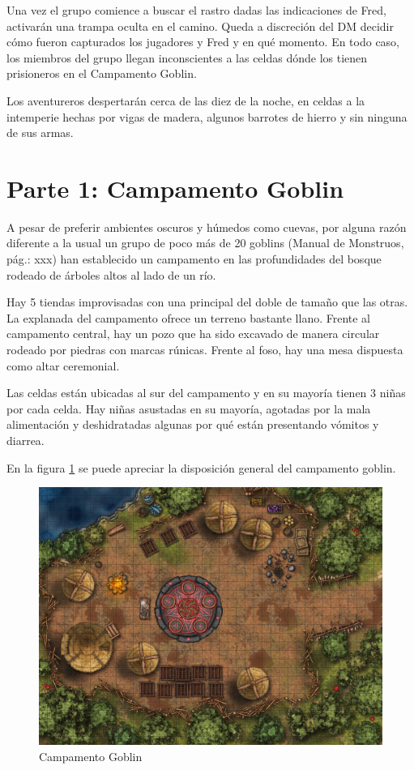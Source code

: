 \documentclass[10pt,twoside,twocolumn,openany]{dndbook}
\begin{document}
Una vez el grupo comience a buscar el rastro dadas las indicaciones de Fred, activarán una trampa
oculta en el camino. Queda a discreción del DM decidir cómo fueron capturados los jugadores y
Fred y en qué momento. En todo caso, los miembros del grupo llegan inconscientes a las celdas 
dónde los tienen prisioneros en el Campamento Goblin.

Los aventureros despertarán cerca de las diez de la noche, en celdas a la intemperie hechas por vigas de 
madera, algunos barrotes de hierro y sin ninguna de sus armas.


\section{Parte 1: Campamento Goblin}

A pesar de preferir ambientes oscuros y húmedos como cuevas, por alguna razón diferente a la usual 
un grupo de poco más de 20 goblins (Manual de Monstruos, pág.: xxx) han establecido un campamento 
en las profundidades del bosque rodeado de árboles altos al lado de un río. 

Hay 5 tiendas improvisadas con una principal del doble de tamaño que las otras. La explanada del 
campamento ofrece un terreno bastante llano. Frente al campamento central, hay un pozo que ha sido 
excavado de manera circular rodeado por piedras con marcas rúnicas. Frente al foso, hay una mesa 
dispuesta como altar ceremonial.

Las celdas están ubicadas al sur del campamento y en su mayoría tienen 3 niñas por cada celda. Hay 
niñas asustadas en su mayoría, agotadas por la mala alimentación y deshidratadas algunas por qué 
están presentando vómitos y diarrea.

En la figura \ref{fig:camp1} se puede apreciar la disposición general del campamento goblin.

\begin{figure}[hb!]
  \centering
  \includegraphics[width=\textwidth]{maps/goblin-camp.jpg}
  \caption{Campamento Goblin}
  \label{fig:camp1}
\end{figure}
\end{document}
